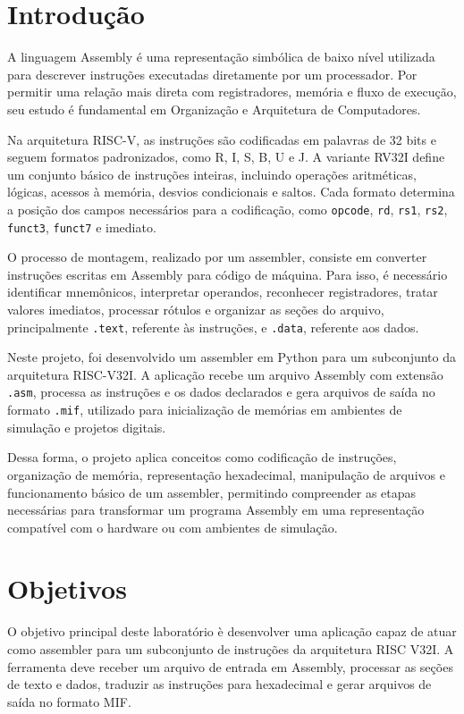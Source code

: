 \documentclass[conference]{IEEEtran}
\begin{document}
\section{Introdução}

A linguagem Assembly é uma representação simbólica de baixo nível utilizada para descrever instruções executadas diretamente por um processador. Por permitir uma relação mais direta com registradores, memória e fluxo de execução, seu estudo é fundamental em Organização e Arquitetura de Computadores.

Na arquitetura RISC-V, as instruções são codificadas em palavras de 32 bits e seguem formatos padronizados, como R, I, S, B, U e J. A variante RV32I define um conjunto básico de instruções inteiras, incluindo operações aritméticas, lógicas, acessos à memória, desvios condicionais e saltos. Cada formato determina a posição dos campos necessários para a codificação, como \texttt{opcode}, \texttt{rd}, \texttt{rs1}, \texttt{rs2}, \texttt{funct3}, \texttt{funct7} e imediato.

O processo de montagem, realizado por um assembler, consiste em converter instruções escritas em Assembly para código de máquina. Para isso, é necessário identificar mnemônicos, interpretar operandos, reconhecer registradores, tratar valores imediatos, processar rótulos e organizar as seções do arquivo, principalmente \texttt{.text}, referente às instruções, e \texttt{.data}, referente aos dados.

Neste projeto, foi desenvolvido um assembler em Python para um subconjunto da arquitetura RISC-V32I. A aplicação recebe um arquivo Assembly com extensão \texttt{.asm}, processa as instruções e os dados declarados e gera arquivos de saída no formato \texttt{.mif}, utilizado para inicialização de memórias em ambientes de simulação e projetos digitais.

Dessa forma, o projeto aplica conceitos como codificação de instruções, organização de memória, representação hexadecimal, manipulação de arquivos e funcionamento básico de um assembler, permitindo compreender as etapas necessárias para transformar um programa Assembly em uma representação compatível com o hardware ou com ambientes de simulação.

\section{Objetivos}

O objetivo principal deste laborat\'{o}rio \`{e} desenvolver uma aplica\c{c}\~{a}o capaz de atuar como assembler para um subconjunto de instru\c{c}\~{o}es da arquitetura RISC V32I. A ferramenta deve receber um arquivo de entrada em Assembly, processar as se\c{c}\~{o}es de texto e dados, traduzir as instru\c{c}\~{o}es para hexadecimal e gerar arquivos de sa\'{i}da no formato MIF.
\end{document}
